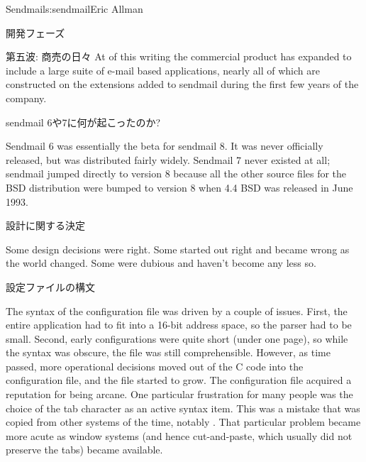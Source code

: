 \begin{aosachapter}{Sendmail}{s:sendmail}{Eric Allman}
\begin{aosasect1}{開発フェーズ}
\begin{aosasect2}{第五波: 商売の日々}
At of this writing the commercial product has expanded to include a large
suite of e-mail based applications, nearly all of which are constructed
on the extensions added to sendmail during the first few years of the
company.

\end{aosasect2}

\begin{aosasect2}{sendmail 6や7に何が起こったのか?}

Sendmail 6 was essentially the beta for sendmail 8. It was never
officially released, but was distributed fairly widely. Sendmail 7
never existed at all; sendmail jumped directly to version 8 because
all the other source files for the BSD distribution were bumped to
version 8 when 4.4 BSD was released in June 1993.

\end{aosasect2}

\end{aosasect1}

\begin{aosasect1}{設計に関する決定}

Some design decisions were right. Some started out right and became
wrong as the world changed. Some were dubious and haven't become any
less so.

\begin{aosasect2}{設定ファイルの構文}

The syntax of the configuration file was driven by a couple of issues.
First, the entire application had to fit into a 16-bit address space,
so the parser had to be small. Second, early configurations were quite
short (under one page), so while the syntax was obscure, the file was
still comprehensible.  However, as time passed, more operational
decisions moved out of the C code into the configuration file, and the
file started to grow. The configuration file acquired a reputation for
being arcane. One particular frustration for many people was the
choice of the tab character as an active syntax item. This was a
mistake that was copied from other systems of the time, notably
. That particular problem became more acute as window
systems (and hence cut-and-paste, which usually did not preserve the
tabs) became available.


\end{aosasect2}
\end{aosasect1}
\end{aosachapter}
